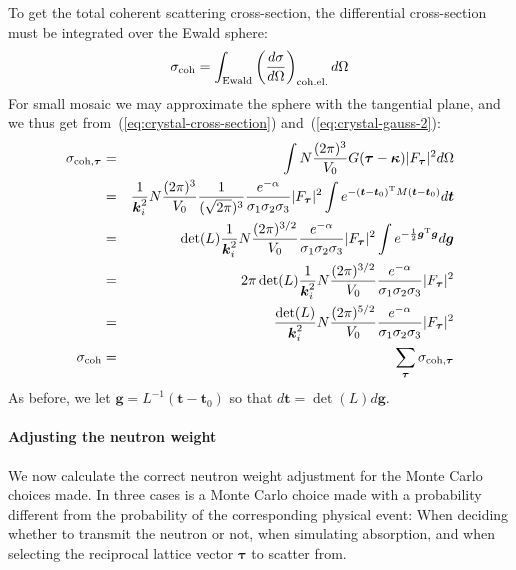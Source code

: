 To get the total coherent scattering cross-section, the differential
cross-section must be integrated over the Ewald sphere:
$$
\sigma_{\rm coh} = \int_{\rm Ewald}
\left(\frac{d\sigma}{d\Omega}\right)_{\rm coh.el.} d\Omega
$$
For small mosaic we may approximate the sphere with the tangential
plane, and we thus get from~(\ref{eq:crystal-cross-section})
and~(\ref{eq:crystal-gauss-2}):
\begin{eqnarray}
  \label{eq:crystal-coh-cs}
  \sigma_{{\rm coh},\boldsymbol{\tau}} &=& \int N\frac{(2\pi)^3}{V_0}
        G(\boldsymbol{\tau} - \boldsymbol{\kappa})
         |F_{\boldsymbol{\tau}}|^2 d\Omega \\
  &=& \frac{1}{\boldsymbol{k}_i^2} N\frac{(2\pi)^3}{V_0}
         \frac{1}{(\sqrt{2\pi})^3}\frac{e^{-\alpha}}{\sigma_1\sigma_2\sigma_3}
         |F_{\boldsymbol{\tau}}|^2
         \int e^{-(\boldsymbol{t}-\boldsymbol{t}_0)^{\rm T} M
         (\boldsymbol{t}-\boldsymbol{t}_0)}
         d\boldsymbol{t} \\
  &=& \det(L) \frac{1}{\boldsymbol{k}_i^2} N\frac{(2\pi)^{3/2}}{V_0}
         \frac{e^{-\alpha}}{\sigma_1\sigma_2\sigma_3}
         |F_{\boldsymbol{\tau}}|^2
         \int e^{-\frac{1}{2}\boldsymbol{g}^{\rm T}\boldsymbol{g}}
         d\boldsymbol{g} \\
  &=& 2\pi\det(L) \frac{1}{\boldsymbol{k}_i^2} N\frac{(2\pi)^{3/2}}{V_0}
         \frac{e^{-\alpha}}{\sigma_1\sigma_2\sigma_3}
         |F_{\boldsymbol{\tau}}|^2 \\
  &=& \frac{\det(L)}{\boldsymbol{k}_i^2} N\frac{(2\pi)^{5/2}}{V_0}
         \frac{e^{-\alpha}}{\sigma_1\sigma_2\sigma_3}
         |F_{\boldsymbol{\tau}}|^2 \\
  \sigma_{\rm coh} &=& \sum_{\boldsymbol{\tau}} \sigma_{{\rm coh},\boldsymbol{\tau}}
\end{eqnarray}
As before, we let $\boldsymbol{g} = L^{-1}(\boldsymbol{t} -
\boldsymbol{t}_0)$ so that $d\boldsymbol{t} = \det(L) d\boldsymbol{g}$.

\paragraph{Adjusting the neutron weight}

We now calculate the correct neutron weight adjustment for the Monte
Carlo choices made. In three cases is a Monte Carlo choice made with a
probability different from the probability of the corresponding physical
event: When deciding whether to transmit the neutron or not, when
simulating absorption, and when selecting the reciprocal lattice vector
$\boldsymbol{\tau}$ to scatter from.

